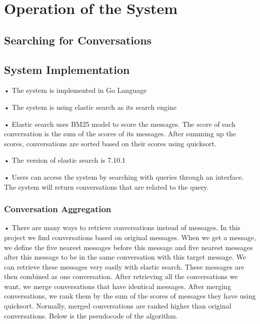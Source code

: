 \section{Operation of the System}

\subsection{Searching for Conversations}


\subsection{System Implementation}

•	The system is implemented in Go Language

•	The system is using elastic search as its search engine

•	Elastic search uses BM25 model to score the messages. The score of each conversation is the sum of the scores of its messages. After summing up the scores, conversations are sorted based on their scores using quicksort.

•	The version of elastic search is 7.10.1

•	Users can access the system by searching with queries through an interface. The system will return conversations that are related to the query.

\subsubsection{Conversation Aggregation}

•	There are many ways to retrieve conversations instead of messages. In this project we find conversations based on original messages. When we get a message, we define the five nearest messages before this message and five nearest messages after this message to be in the same conversation with this target message. We can retrieve these messages very easily with elastic search. These messages are then combined as one conversation. After retrieving all the conversations we want, we merge conversations that have identical messages. After merging conversations, we rank them by the sum of the scores of messages they have using quicksort. Normally, merged conversations are ranked higher than original conversations. Below is the pseudocode of the algorithm.

